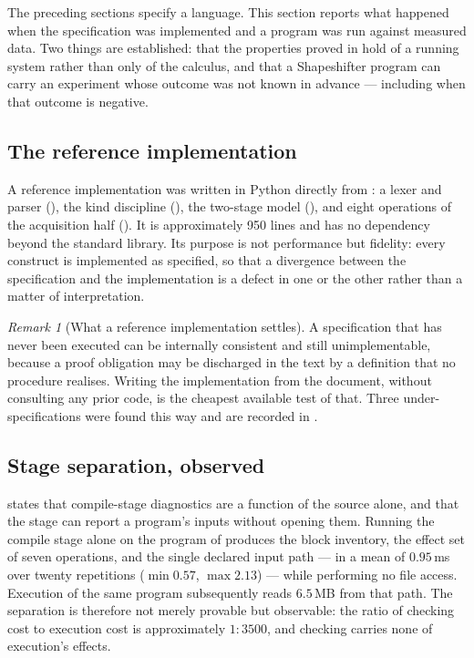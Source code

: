 \documentclass[11pt,twocolumn,a4paper]{article}
\theoremstyle{ssthm}
\theoremstyle{definition}
\theoremstyle{remark}
\newtheorem{remark}[theorem]{Remark}
\begin{document}
The preceding sections specify a language. This section reports what
happened when the specification was implemented and a program was run
against measured data. Two things are established: that the properties
proved in  hold of a running system rather
than only of the calculus, and that a Shapeshifter program can carry an
experiment whose outcome was not known in advance --- including when that
outcome is negative.

\subsection{The reference implementation}

A reference implementation was written in Python directly from
: a lexer and parser
(), the kind discipline
(), the two-stage model (), and eight
operations of the acquisition half (). It is
approximately 950 lines and has no dependency beyond the standard
library. Its purpose is not performance but fidelity: every construct is
implemented as specified, so that a divergence between the specification
and the implementation is a defect in one or the other rather than a
matter of interpretation.

\begin{remark}[What a reference implementation settles]
\label{rem:reference-impl}
A specification that has never been executed can be internally consistent
and still unimplementable, because a proof obligation may be discharged in
the text by a definition that no procedure realises. Writing the
implementation from the document, without consulting any prior code, is
the cheapest available test of that. Three under-specifications were
found this way and are recorded in .
\end{remark}

\subsection{Stage separation, observed}

 states that compile-stage diagnostics are a
function of the source alone, and  that the stage can
report a program's inputs without opening them. Running the compile stage
alone on the program of  produces the block
inventory, the effect set of seven operations, and the single declared
input path --- in a mean of $0.95$\,ms over twenty repetitions
($\min 0.57$, $\max 2.13$) --- while performing no file access. Execution
of the same program subsequently reads $6.5$\,MB from that path. The
separation is therefore not merely provable but observable: the ratio of
checking cost to execution cost is approximately $1:3500$, and checking
carries none of execution's effects.
\end{document}
